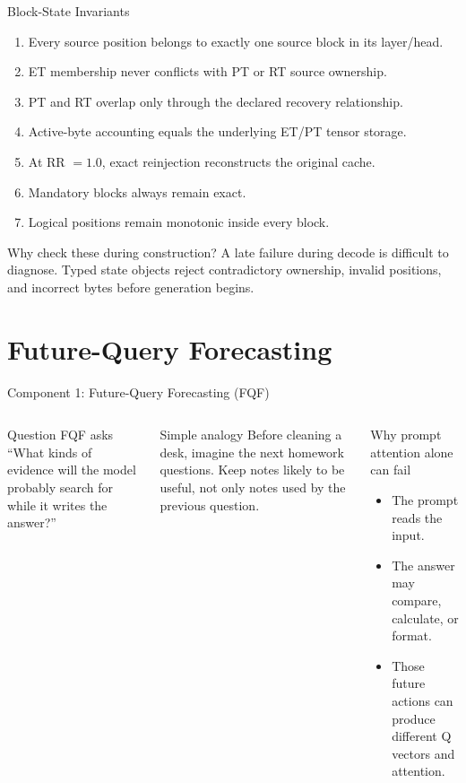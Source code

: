 \documentclass[aspectratio=169,10pt]{beamer}
\newcommand{\tightitems}{\setlength{\itemsep}{0.28em}\setlength{\parskip}{0pt}}
\begin{document}
\begin{frame}{Block-State Invariants}
\small
\begin{enumerate}\tightitems
  \item Every source position belongs to exactly one source block in its layer/head.
  \item ET membership never conflicts with PT or RT source ownership.
  \item PT and RT overlap only through the declared recovery relationship.
  \item Active-byte accounting equals the underlying ET/PT tensor storage.
  \item At RR $=1.0$, exact reinjection reconstructs the original cache.
  \item Mandatory blocks always remain exact.
  \item Logical positions remain monotonic inside every block.
\end{enumerate}
\begin{exampleblock}{Why check these during construction?}
A late failure during decode is difficult to diagnose. Typed state objects reject contradictory
ownership, invalid positions, and incorrect bytes before generation begins.
\end{exampleblock}
\end{frame}

\section{Future-Query Forecasting}

\begin{frame}{Component 1: Future-Query Forecasting (FQF)}
\small
\begin{columns}[T,onlytextwidth]
\begin{block}{Question FQF asks}
``What kinds of evidence will the model probably search for while it writes the answer?''
\end{block}
\begin{exampleblock}{Simple analogy}
Before cleaning a desk, imagine the next homework questions. Keep notes likely to be useful, not
only notes used by the previous question.
\end{exampleblock}
\begin{alertblock}{Why prompt attention alone can fail}
\begin{itemize}\tightitems
  \item The prompt reads the input.
  \item The answer may compare, calculate, or format.
  \item Those future actions can produce different Q vectors and attention.
\end{itemize}
\end{alertblock}
\end{columns}
\end{frame}
\end{document}
